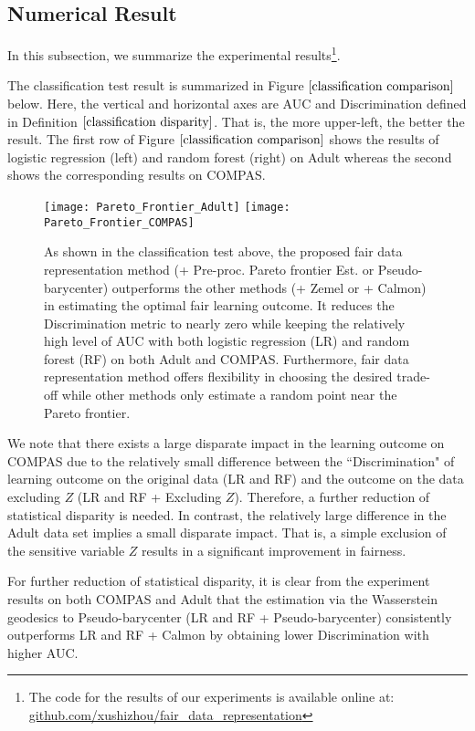 \documentclass[twoside,11pt]{article}
\begin{document}
\subsection{Numerical Result}

In this subsection, we summarize the experimental results\footnote{The code for the results of our experiments is available online at: \url{github.com/xushizhou/fair_data_representation}}.

The classification test result is summarized in Figure $\ref{classification comparison}$ below.  Here, the vertical and horizontal axes are AUC and Discrimination defined in Definition $\ref{classification disparity}$. That is, the more upper-left, the better the result. The first row of Figure $\ref{classification comparison}$ shows the results of logistic regression (left) and random forest (right) on Adult whereas the second shows the corresponding results on COMPAS.

\begin{figure}[H]
\centering
\texttt{[image: Pareto\_Frontier\_Adult]}\hfill
\texttt{[image: Pareto\_Frontier\_COMPAS]}
\caption{As shown in the classification test above, the proposed fair data representation method (+ Pre-proc. Pareto frontier Est. or Pseudo-barycenter) outperforms the other methods (+ Zemel or + Calmon) in estimating the optimal fair learning outcome. It reduces the Discrimination metric to nearly zero while keeping the relatively high level of AUC with both logistic regression (LR) and random forest (RF) on both Adult and COMPAS. Furthermore, fair data representation method offers flexibility in choosing the desired trade-off while other methods only estimate a random point near the Pareto frontier.}
\label{classification comparison}
\end{figure}

We note that there exists a large disparate impact in the learning outcome on COMPAS due to the relatively small difference between the ``Discrimination" of learning outcome on the original data (LR and RF) and the outcome on the data excluding $Z$ (LR and RF + Excluding $Z$). Therefore, a further reduction of statistical disparity is needed. In contrast, the relatively large difference in the Adult data set implies a small disparate impact. That is, a simple exclusion of the sensitive variable $Z$ results in a significant improvement in fairness.

For further reduction of statistical disparity, it is clear from the experiment results on both COMPAS and Adult that the estimation via the Wasserstein geodesics to Pseudo-barycenter (LR and RF + Pseudo-barycenter) consistently outperforms LR and RF + Calmon by obtaining lower Discrimination with higher AUC.
\end{document}
